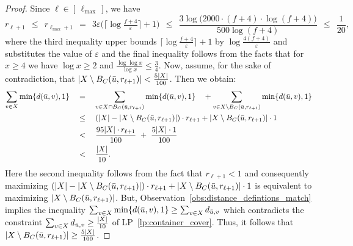 \begin{proof}
    Since $\ell \in [\,\ell_{\max}\,]$, we have
    $$
    r_{\ell+1}
    \ \ \le \ \ r_{\ell_{\max}+1}
    \ \ = \ \ 3\varepsilon\bigl(\lceil \log \tfrac{f+4}{\varepsilon}\rceil + 1\bigr)
    \ \ \le \ \ \frac{3\log \bigl(2000 \cdot (f+4) \cdot \log (f+4)\bigr)}{500 \log (f+4)}
    \ \ \le \ \ \frac{1}{20},
    $$
    where the third inequality upper bounds $\lceil \log \tfrac{f+4}{\varepsilon}\rceil + 1$ by $\log \tfrac{4(f+4)}{\varepsilon}$ and substitutes the value of $\varepsilon$ and the final inequality follows from the facts that for $x \ge 4$ we have $\log x \ge 2$ and $\frac{\log\log x}{\log x} \le \tfrac{3}{4}$. Now, assume, for the sake of contradiction, that $\left| X \setminus B_C(\Bar{u}, r_{\ell+1}) \right| < \frac{5|X|}{100}$.
    Then we obtain:
    $$
    \begin{aligned}
    \sum_{v \in X} \min\{d(\bar{u}, v),1\} \quad
    &=\quad \sum_{v \in X \cap B_C(\bar{u}, r_{\ell+1})} \min\{d(\bar{u}, v),1\} 
      \quad + \sum_{v \in X \setminus B_C(\bar{u}, r_{\ell+1})} \min\{d(\bar{u}, v),1\} \\
    &\leq \quad\left(|X| - |X\setminus B_C(\Bar{u}, r_{\ell+1})|\right)\cdot r_{\ell+1} + |X\setminus B_C(\Bar{u}, r_{\ell+1})|\cdot 1 \\
    &<\quad \frac{95|X| \cdot r_{\ell+1}}{100}\ +\ \frac{5|X| \cdot 1}{100} \\
    &<\quad \frac{|X|}{10}.
    \end{aligned}
    $$
    Here the second inequality follows from the fact that $r_{\ell+1} < 1$ and consequently maximizing $\left(|X| - |X\setminus B_C(\Bar{u}, r_{\ell+1})|\right)\cdot r_{\ell+1} + |X\setminus B_C(\Bar{u}, r_{\ell+1})|\cdot 1$ is equivalent to maximizing $|X\setminus B_C(\Bar{u}, r_{\ell+1})|$.
    But, Observation~\ref{obs:distance_defintions_match} implies the inequality $\sum_{v \in X} \min\{d(\bar{u}, v),1\} \geq \sum_{v \in X} d_{\Bar{u},v}$ which contradicts the constraint $\sum_{v \in X} d_{\Bar{u}, v} \geq \frac{|X|}{10}$ of LP~\ref{lp:container_cover}. Thus, it follows that $|X \setminus B_C(\Bar{u}, r_{\ell+1})| \geq \frac{5|X|}{100}$.
\end{proof}



